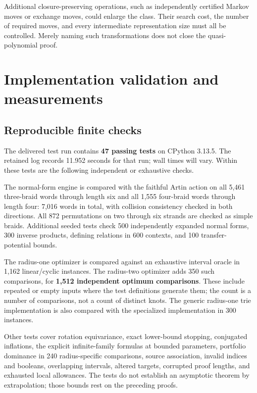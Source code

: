 \documentclass[11pt,a4paper]{article}
\theoremstyle{definition}\newtheorem{definition}[theorem]{Definition}
\theoremstyle{remark}\newtheorem{remark}[theorem]{Remark}
\begin{document}
Additional closure-preserving operations, such as independently certified
Markov moves or exchange moves, could enlarge the class. Their search
cost, the number of required moves, and every intermediate representation
size must all be controlled. Merely naming such transformations does not
close the quasi-polynomial proof.

\section{Implementation validation and measurements}\label{sec:experiments}

\subsection{Reproducible finite checks}
The delivered test run contains \textbf{47 passing tests} on CPython 3.13.5.
The retained log records 11.952 seconds for that run; wall times will vary.
Within these tests are the following independent or exhaustive checks.

The normal-form engine is compared with the faithful Artin action on all
5,461 three-braid words through length six and all 1,555 four-braid words
through length four: 7,016 words in total, with collision consistency checked
in both directions. All 872 permutations on two through six strands are
checked as simple braids. Additional seeded tests check 500 independently
expanded normal forms, 300 inverse products, defining relations in 600
contexts, and 100 transfer-potential bounds.

The radius-one optimizer is compared against an exhaustive interval oracle
in 1,162 linear/cyclic instances. The radius-two optimizer adds 350 such
comparisons, for \textbf{1,512 independent optimum comparisons}. These
include repeated or empty inputs where the test definitions generate them;
the count is a number of comparisons, not a count of distinct knots.
The generic radius-one trie implementation is also compared with the
specialized implementation in 300 instances.

Other tests cover rotation equivariance, exact lower-bound stopping,
conjugated inflations, the explicit infinite-family formulas at bounded
parameters, portfolio dominance in 240 radius-specific comparisons, source
association, invalid indices and booleans, overlapping intervals, altered
targets, corrupted proof lengths, and exhausted local allowances.
The tests do not establish an asymptotic theorem by extrapolation; those
bounds rest on the preceding proofs.
\end{document}
